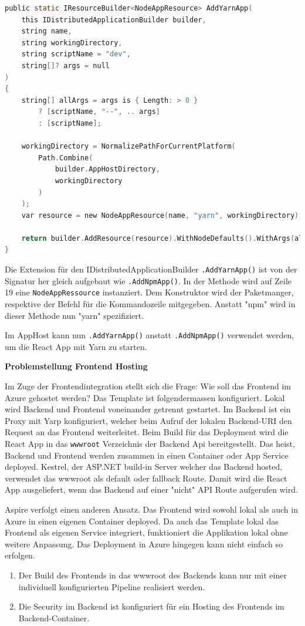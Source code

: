             \begin{lstlisting}[language=C, caption=Custom Extension für die Integration einer Yarn App]         
public static IResourceBuilder<NodeAppResource> AddYarnApp(
    this IDistributedApplicationBuilder builder, 
    string name, 
    string workingDirectory, 
    string scriptName = "dev", 
    string[]? args = null
)
{
    string[] allArgs = args is { Length: > 0 }
        ? [scriptName, "--", .. args]
        : [scriptName];

    workingDirectory = NormalizePathForCurrentPlatform(
        Path.Combine(
            builder.AppHostDirectory, 
            workingDirectory
        )
    );
    var resource = new NodeAppResource(name, "yarn", workingDirectory);

    return builder.AddResource(resource).WithNodeDefaults().WithArgs(allArgs);
}
            \end{lstlisting}

            Die Extension für den IDistributedApplicationBuilder \verb|.AddYarnApp()| ist von der Signatur her gleich aufgebaut wie \verb|.AddNpmApp()|. In der Methode wird auf Zeile 19 eine \verb|NodeAppRessource| instanziert. Dem Konstruktor wird der Paketmanger, respektive der Befehl für die Kommandozeile mitgegeben. Anstatt "npm" wird in dieser Methode nun "yarn" spezifiziert. 

            Im AppHost kann nun \verb|.AddYarnApp()| anstatt \verb|.AddNpmApp()| verwendet werden, um die React App mit Yarn zu starten.

            \textbf{Problemstellung Frontend Hosting}

            Im Zuge der Frontendintegration stellt sich die Frage: Wie soll das Frontend im Azure gehostet werden? Das Template ist folgendermassen konfiguriert. Lokal wird Backend und Frontend voneinander getrennt gestartet. Im Backend ist ein Proxy mit Yarp konfiguriert, welcher beim Aufruf der lokalen Backend-URI den Request an das Frontend weiterleitet. Beim Build für das Deployment wird die React App in das \verb|wwwroot| Verzeichnis der Backend Api bereitgestellt. Das heist, Backend und Frontend werden zusammen in einen Container oder App Service deployed. Kestrel, der ASP.NET build-in Server welcher das Backend hosted, verwendet das wwwroot als default oder fallback Route. Damit wird die React App ausgeliefert, wenn das Backend auf einer "nicht" API Route aufgerufen wird.

            Aspire verfolgt einen anderen Ansatz. Das Frontend wird sowohl lokal als auch in Azure in einen eigenen Container deployed. Da auch das Template lokal das Frontend als eigenen Service integriert, funktioniert die Applikation lokal ohne weitere Anpassung. Das Deployment in Azure hingegen kann nicht einfach so erfolgen. 
            \begin{enumerate}
                \item Der Build des Frontends in das wwwroot des Backends kann nur mit einer individuell konfigurierten Pipeline realisiert werden.
                \item Die Security im Backend ist konfiguriert für ein Hosting des Frontends im Backend-Container.                
            \end{enumerate}

